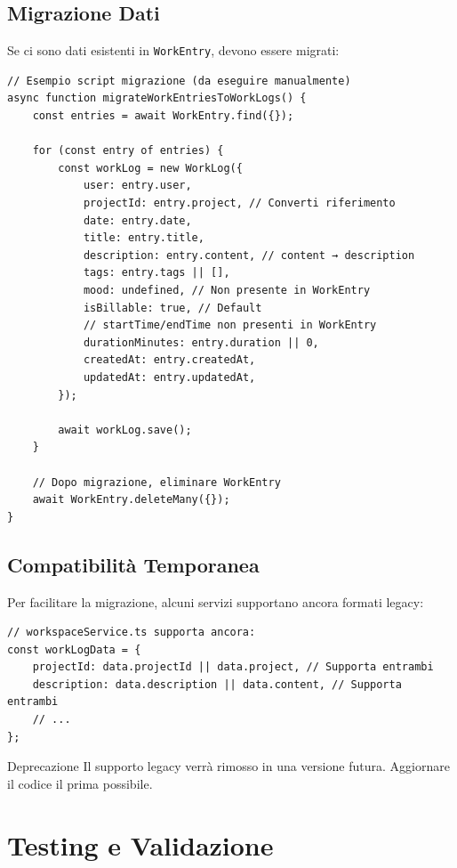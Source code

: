 \documentclass[11pt,a4paper]{article}
\begin{document}
\subsection{Migrazione Dati}

Se ci sono dati esistenti in \texttt{WorkEntry}, devono essere migrati:

\begin{lstlisting}[caption=Script Migrazione Dati]
// Esempio script migrazione (da eseguire manualmente)
async function migrateWorkEntriesToWorkLogs() {
    const entries = await WorkEntry.find({});
    
    for (const entry of entries) {
        const workLog = new WorkLog({
            user: entry.user,
            projectId: entry.project, // Converti riferimento
            date: entry.date,
            title: entry.title,
            description: entry.content, // content → description
            tags: entry.tags || [],
            mood: undefined, // Non presente in WorkEntry
            isBillable: true, // Default
            // startTime/endTime non presenti in WorkEntry
            durationMinutes: entry.duration || 0,
            createdAt: entry.createdAt,
            updatedAt: entry.updatedAt,
        });
        
        await workLog.save();
    }
    
    // Dopo migrazione, eliminare WorkEntry
    await WorkEntry.deleteMany({});
}
\end{lstlisting}

\subsection{Compatibilità Temporanea}

Per facilitare la migrazione, alcuni servizi supportano ancora formati legacy:

\begin{lstlisting}[caption=Supporto Legacy]
// workspaceService.ts supporta ancora:
const workLogData = {
    projectId: data.projectId || data.project, // Supporta entrambi
    description: data.description || data.content, // Supporta entrambi
    // ...
};
\end{lstlisting}

\begin{warningbox}{Deprecazione}
Il supporto legacy verrà rimosso in una versione futura. Aggiornare il codice il prima possibile.
\end{warningbox}

\section{Testing e Validazione}
\end{document}
